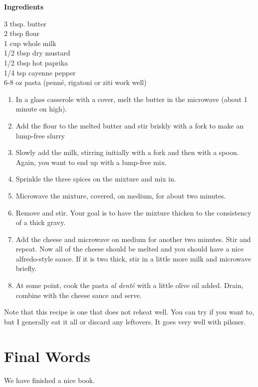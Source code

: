 \documentclass[
]{book}
\providecommand{\tightlist}{%
  \setlength{\itemsep}{0pt}\setlength{\parskip}{0pt}}
\begin{document}
\textbf{Ingredients}

3 tbsp. butter\\
2 tbsp flour\\
1 cup whole milk\\
1/2 tbsp dry mustard\\
1/2 tbsp hot paprika\\
1/4 tsp cayenne pepper\\
6-8 oz pasta (penné, rigatoni or ziti work well)

\begin{enumerate}
\def\labelenumi{\arabic{enumi}.}
\tightlist
\item
  In a glass casserole with a cover, melt the butter in the microwave (about 1 minute on high).
\item
  Add the flour to the melted butter and stir briskly with a fork to make an lump-free slurry
\item
  Slowly add the milk, stirring initially with a fork and then with a spoon. Again, you want to end up with a lump-free mix.
\item
  Sprinkle the three spices on the mixture and mix in.
\item
  Microwave the mixture, covered, on medium, for about two minutes.
\item
  Remove and stir. Your goal is to have the mixture thicken to the consistency of a thick gravy.
\item
  Add the cheese and microwave on medium for another two minutes. Stir and repeat. Now all of the cheese should be melted and you should have a nice alfredo-style sauce. If it is two thick, stir in a little more milk and microwave briefly.
\item
  At some point, cook the pasta \emph{al denté} with a little olive oil added. Drain, combine with the cheese sauce and serve.
\end{enumerate}

Note that this recipe is one that does not reheat well. You can try if you want to, but I generally eat it all or discard any leftovers. It goes very well with pilsner.

\hypertarget{final-words}{%
\chapter{Final Words}\label{final-words}}

We have finished a nice book.

  
\end{document}
